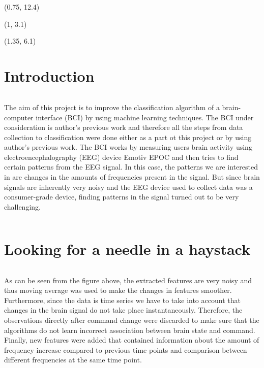 \documentclass[final]{beamer}
\author{\hspace{1cm}\textbf{Author: Anti Ingel}$^1$\\\hspace{1cm}\url{https://github.com/kahvel/MAProject}}
\institute{\hspace{1cm}$^1$Computer Science, 1st year of MSc,\\\hspace{1cm}University of Tartu faculty of Science and Technology,\\\hspace{1cm}Institute of Computer Science}
\begin{document}
\begin{poster}

\begin{textblock}{10}(0.75, 12.4)
	
\end{textblock}

\begin{textblock}{10}(1, 3.1)
	
\end{textblock}

\begin{textblock}{10}(1.35, 6.1)
	
\end{textblock}

\newcolumn
\section{Introduction}
\begin{columns}[T]
\vspace{1.7cm}
\justify
The aim of this project is to improve the classification algorithm of a brain-computer interface (BCI) by using machine learning techniques. The BCI under consideration is author's previous work and therefore all the steps from data collection to classification were done either as a part ot this project or by using author's previous work. The BCI works by measuring users brain activity using electroencephalography (EEG) device Emotiv EPOC and then tries to find certain patterns from the EEG signal. In this case, the patterns we are interested in are changes in the amounts of frequencies present in the signal. But since brain signals are inherently very noisy and the EEG device used to collect data was a consumer-grade device, finding patterns in the signal turned out to be very challenging.
\end{columns}

\vspace{22.1cm}

\section{Looking for a needle in a haystack}

\begin{columns}[T]
	\vspace{1.7cm}
	\justify
As can be seen from the figure above, the extracted features are very noisy and thus moving average was used to make the changes in features smoother. Furthermore, since the data is time series we have to take into account that changes in the brain signal do not take place instantaneously. Therefore, the observations directly after command change were discarded to make sure that the algorithms do not learn incorrect association between brain state and command.
Finally, new features were added that contained information about the amount of frequency increase compared to previous time points and comparison between different frequencies at the same time point. 
\end{columns}


\end{poster}
\end{document}
